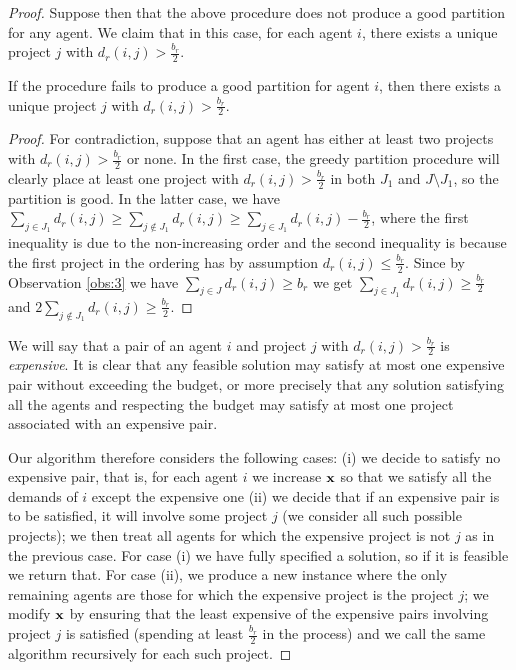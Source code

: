 \documentclass{article}
\begin{document}
\begin{proof}
Suppose then that the above procedure does not produce a good partition for any
agent. We claim that in this case, for each agent $i$, there exists a unique
project $j$ with $d_r(i,j)>\frac{b_r}{2}$.

\begin{observation} \label{obser_proc_fails} If the %
procedure fails to produce a good partition
for agent $i$, then there exists a unique project $j$ with
$d_r(i,j)>\frac{b_r}{2}$.\end{observation}

\begin{proof} For contradiction, suppose that an agent has either at least two
projects with $d_r(i,j)>\frac{b_r}{2}$ or none. In the first case, the greedy
partition procedure will clearly place at least one project with
$d_r(i,j)>\frac{b_r}{2}$ in both $J_1$ and $J\setminus J_1$, so the partition
is good. In the latter case, we have $\sum_{j\in J_1} d_r(i,j) \ge
\sum_{j\not\in J_1} d_r(i,j) \ge \sum_{j\in J_1} d_r(i,j) - \frac{b_r}{2}$,
where the first inequality is due to the non-increasing order and the second
inequality is because the first project in the ordering has by assumption
$d_r(i,j)\le \frac{b_r}{2}$. Since by Observation \ref{obs:3} we have
$\sum_{j\in J} d_r(i,j) \ge b_r$ we get $\sum_{j\in J_1} d_r(i,j) \ge
\frac{b_r}{2}$ and $2\sum_{j\not\in J_1} d_r(i,j)\ge \frac{b_r}{2}$.  \end{proof}

We will say that a pair of an agent $i$ and project $j$ with
$d_r(i,j)>\frac{b_r}{2}$ is \emph{expensive}. It is clear that any feasible
solution may satisfy at most one expensive pair without exceeding the budget, or more precisely that  any 
solution satisfying all the agents and respecting the budget may satisfy at most one project associated with an expensive pair.

Our algorithm therefore considers the following cases: (i) we decide to satisfy
no expensive pair, that is, for each agent $i$ we increase $\bf x$ so that we
satisfy all the demands of $i$ except the expensive one (ii) we decide that if
an expensive pair is to be satisfied, it will involve some project %
$j$ (we
consider all such possible projects); we then treat all agents for which the
expensive project is not $j$ as in the previous case. For case (i) we have
fully specified a solution, so if it is feasible we return that. For case (ii),
we produce a new instance where the only remaining agents are those for which
the expensive project is the project $j$; we modify ${\bf x}$ by ensuring that the least expensive of the expensive pairs involving project $j$ is satisfied (spending at least $\frac{b_r}{2}$ in the process) and we call the same algorithm
recursively for each such project.


\end{proof}
\end{document}
